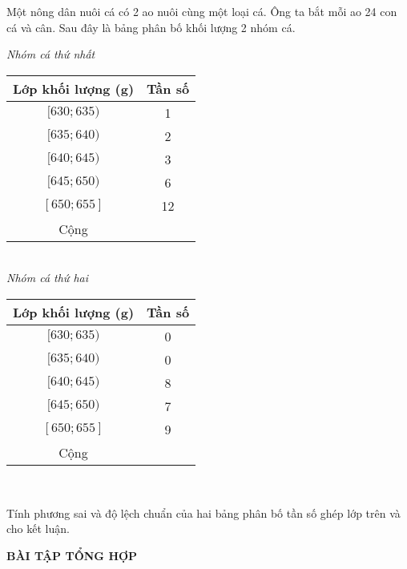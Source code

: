 \begin{bt}%
	Một nông dân nuôi cá có 2 ao nuôi cùng một loại cá. Ông ta bắt mỗi ao 24 con cá và cân. Sau đây là bảng phân bố khối lượng 2 nhóm cá.
	\begin{center}
		\emph{Nhóm cá thứ nhất}\\
		\begin{tabular}{|c|c|}
			\hline
			Lớp khối lượng (g) & Tần số\\\hline
			$[630;635)$ & 1\\
			$[635;640)$ & 2\\
			$[640;645)$ & 3\\
			$[645;650)$ & 6\\
			$[650;655]$ & 12\\\hline
			Cộng & \\\hline
		\end{tabular}\\
		\emph{Nhóm cá thứ hai}\\
		\begin{tabular}{|c|c|}
			\hline
			Lớp khối lượng (g) & Tần số\\\hline
			$[630;635)$ & 0\\
			$[635;640)$ & 0\\
			$[640;645)$ & 8\\
			$[645;650)$ & 7\\
			$[650;655]$ & 9\\\hline
			Cộng & \\\hline
		\end{tabular}\\
	\end{center}
	Tính phương sai và độ lệch chuẩn của hai bảng phân bố tần số ghép lớp trên và cho kết luận.
\end{bt}


\begin{center}
	\textbf{BÀI TẬP TỔNG HỢP}
\end{center}

